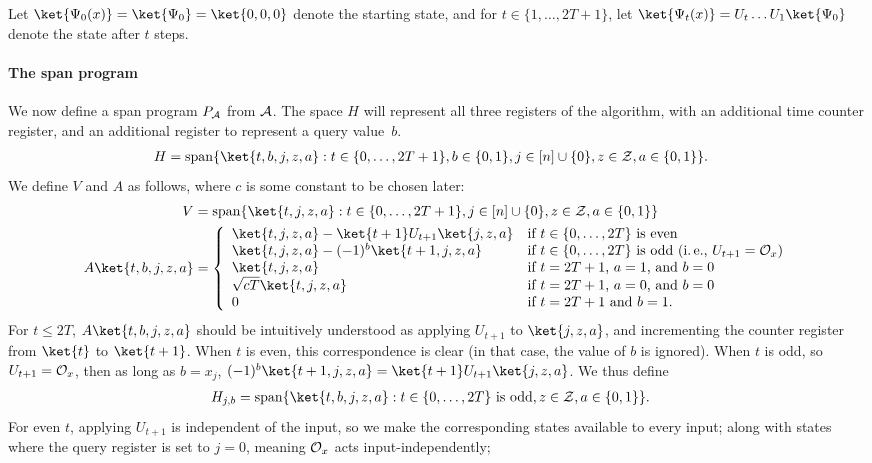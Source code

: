 \documentclass[11pt]{article}
\numberwithin{equation}{section}
\theoremstyle{definition}
\theoremstyle{plain}
\newcommand{\ie}{i.\,e.}
\begin{document}
Let $\ket{\Psi_0(x)}=\ket{\Psi_0}=\ket{0,0,0}$ denote the starting state, and for $t\in\{1,\dots, 2T+1\}$, let $\ket{\Psi_t(x)}=U_t\dots U_1\ket{\Psi_0}$ denote the state after $t$ steps. 

\paragraph{The span program} We now define a span program $P_{\cal A}$ from ${\cal A}$. The space $H$ will represent all three registers of the algorithm, with an additional time counter register, and an additional register to represent a query value~$b$. 
\begin{align*}
H &= \mathrm{span}\{\ket{t,b,j,z,a}:t\in\{0,\dots,2T+1\}, b\in\{0,1\}, j\in [n]\cup\{0\}, z\in{\cal Z}, a\in\{0,1\}\}.
\end{align*}
We define $V$ and $A$ as follows, where $c$ is some constant to be chosen later:
\begin{align*}
V &= \mathrm{span}\{\ket{t,j,z,a}:t\in\{0,\dots,2T+1\}, j\in[n]\cup\{0\}, z\in{\cal Z}, a\in\{0,1\}\}\\
A\ket{t,b,j,z,a} &= \left\{\begin{array}{ll}
\ket{t,j,z,a}-\ket{t+1}U_{t+1}\ket{j,z,a} & \mbox{if $t\in\{0,\dots,2T\}$ is even}\\
\ket{t,j,z,a}-(-1)^b\ket{t+1,j,z,a} & \mbox{if $t\in\{0,\dots,2T\}$ is odd (\ie, $U_{t+1}={\cal O}_x$)}\\
\ket{t,j,z,a} & \mbox{if $t=2T+1$, $a=1$, and $b=0$}\\
\sqrt{cT}\ket{t,j,z,a} & \mbox{if $t=2T+1$, $a=0$, and $b=0$}\\
0 & \mbox{if $t=2T+1$ and $b=1$.}
\end{array}\right.
\end{align*}
For $t\leq 2T$, $A\ket{t,b,j,z,a}$ should be intuitively understood as applying $U_{t+1}$ to $\ket{j,z,a}$, and incrementing the counter register from $\ket{t}$ to $\ket{t+1}$. When $t$ is even, this correspondence is clear (in that case, the value of $b$ is ignored). When $t$ is odd, so  $U_{t+1}={\cal O}_x$, then as long as $b=x_j$, $(-1)^b\ket{t+1,j,z,a}=\ket{t+1}U_{t+1}\ket{j,z,a}$. We thus define
\begin{align*}
H_{j,b} &= \mathrm{span}\{\ket{t,b,j,z,a}:t\in\{0,\dots,2T\}\mbox{ is odd}, z\in{\cal Z}, a\in\{0,1\}\}.
\end{align*}
For even $t$, applying $U_{t+1}$ is independent of the input, so we make the corresponding states available to every input; along with states where the query register is set to $j=0$, meaning ${\cal O}_x$ acts input-independently;
\end{document}
